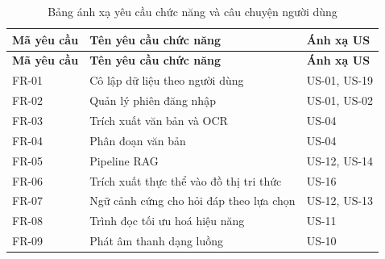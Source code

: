 \begin{longtable}{|C{0.12\textwidth}|L{0.52\textwidth}|C{0.24\textwidth}|}
\caption{Bảng ánh xạ yêu cầu chức năng và câu chuyện người dùng}\label{tab:functional-requirement-mapping}\\
\hline
\textbf{Mã yêu cầu} & \textbf{Tên yêu cầu chức năng} & \textbf{Ánh xạ US} \\
\hline
\endfirsthead
\hline
\textbf{Mã yêu cầu} & \textbf{Tên yêu cầu chức năng} & \textbf{Ánh xạ US} \\
\hline
\endhead
FR-01 & Cô lập dữ liệu theo người dùng & US-01, US-19 \\\hline
FR-02 & Quản lý phiên đăng nhập & US-01, US-02 \\\hline
FR-03 & Trích xuất văn bản và OCR & US-04 \\\hline
FR-04 & Phân đoạn văn bản & US-04 \\\hline
FR-05 & Pipeline RAG & US-12, US-14 \\\hline
FR-06 & Trích xuất thực thể vào đồ thị tri thức & US-16 \\\hline
FR-07 & Ngữ cảnh cứng cho hỏi đáp theo lựa chọn & US-12, US-13 \\\hline
FR-08 & Trình đọc tối ưu hoá hiệu năng & US-11 \\\hline
FR-09 & Phát âm thanh dạng luồng & US-10 \\\hline
\end{longtable}

